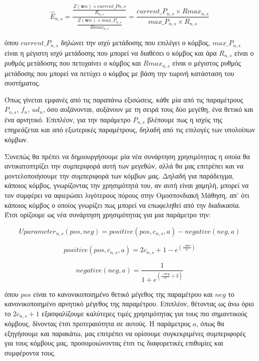 \vspace{-5pt}

\begin{equation}
\hat{E}_{n,s}=\frac{\frac{Z(\mathbf{w}n)\times current\_P{n,s}}{R_{n,s}}}{\frac{Z(\mathbf{w}n)\times max\_P_{n,s}}{Rmax_{n,s}}} = \frac{current\_P_{n,s}\times Rmax_{n,s}}{max\_P_{n,s}\times R_{n,s}}
\label{eq23}
\end{equation}

\vspace{-3pt}

\noindent
όπου $current\_P_{n,s}$ δηλώνει την ισχύ μετάδοσης που επιλέγει ο κόμβος, $max\_P_{n,s}$ είναι η μέγιστη ισχύ μετάδοσης που μπορεί να διαθέσει ο κόμβος και άρα $R_{n,s}$ είναι ο ρυθμός μετάδοσης που πετυχαίνει ο κόμβος και $Rmax_{n,s}$ είναι ο μέγιστος ρυθμός μετάδοσης που μπορεί να πετύχει ο κόμβος με βάση την τωρινή κατάσταση του συστήματος.

Όπως γίνεται εμφανές από τις παραπάνω εξισώσεις, κάθε μία από τις παραμέτρους $P_{n,s}$, $f_n$, $ud_n$, όσο αυξάνονται, αυξάνουν με τη σειρά τους δύο μεγέθη, ένα θετικό και ένα αρνητικό. Επιπλέον, για την παράμετρο $P_{n,s}$ βλέπουμε πως η ισχύς της επηρεάζεται και από εξωτερικές παραμέτρους, δηλαδή από τις επιλογές των υπολοίπων κόμβων.

Συνεπώς θα πρέπει να δημιουργήσουμε μία νέα συνάρτηση χρησιμότητας η οποία θα αντικατοπτρίζει την συμπεριφορά αυτή των μεγεθών, αλλά θα μας επιτρέπει και να μοντελοποιήσουμε την συμπεριφορά των κόμβων μας. Δηλαδή για παράδειγμα, κάποιος κόμβος, γνωρίζοντας την χρησιμότητά του, αν αυτή είναι χαμηλή, μπορεί να τον συμφέρει να αφιερώσει λιγότερους πόρους στην Ομοσπονδιακή Μάθηση, απ' ότι κάποιος κόμβος ο οποίος γνωρίζει πως μπορεί να επωφεληθεί από την διαδικασία. Έτσι ορίζουμε ως νέα συνάρτηση χρησιμότητας για μια παράμετρο την:

\vspace{-5pt}

\begin{equation}
Uparameter_{n,s}(pos, neg) = positive(pos, c_{n,s}, a) - negative(neg, a) 
\label{eq24}
\end{equation}

\vspace{-3pt}

\[positive(pos, c_{n,s}, a) = 2c_{n,s} + 1 - e^{(\frac{-pos}{a})}\]

\[negative(neg, a) = \frac{1}{1 + e^{(\frac{-neg}{a} + 3)}}\]

\noindent
όπου $pos$ είναι το κανονικοποιημένο θετικό μέγεθος της παραμέτρου και $neg$ το κανονικοποιημένο αρνητικό μέγεθος της παραμέτρου. Επιπλέον, θέτοντας ως άνω όριο το $2c_{n,s} + 1$ εξασφαλίζουμε καλύτερες τιμές χρησιμότητας για τους πιο σημαντικούς κόμβους, δίνοντας έτσι προτεραιότητα σε αυτούς. Η παράμετρος $a$, όπως θα εξηγήσουμε και παρακάτω, μας επιτρέπει να ορίσουμε συγκεκριμένες συμπεριφορές για τους κόμβους μας, προσομοιώνοντας έτσι τις διαφορετικές επιθυμίες και συμφέροντα τους.

